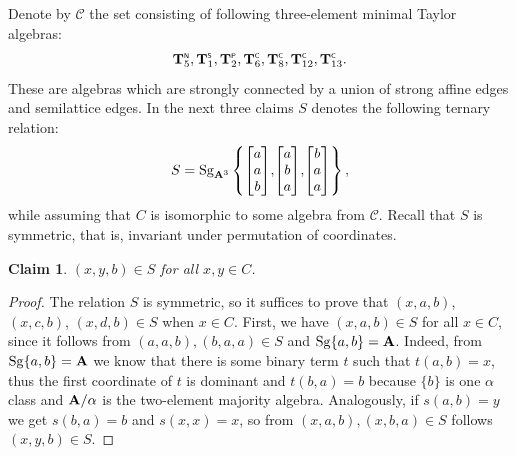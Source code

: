 \documentclass[11pt]{amsart}
\newcommand{\m}[1]{\mathbf{\uppercase{#1}}}
\newcommand{\n}{\scriptscriptstyle{\mathsf{N}}}
\newcommand{\co}{\scriptscriptstyle{\mathsf{C}}}
\theoremstyle{definition}
\theoremstyle{remark}
\theoremstyle{plain}
\newtheorem{claim}[thm]{Claim}
\begin{document}
Denote by $\mathcal{C}$ the set consisting of following three-element minimal Taylor algebras: $$\m t_5^{\n}, \m t_1^{\scriptscriptstyle{\mathsf{S}}}, \m t_2^{\scriptscriptstyle{\mathsf{P}}}, \m t_6^{\co}, \m t_8^{\co}, \m t_{12}^{\co}, \m t_{13}^{\co}.$$
These are algebras which are strongly connected by a union of strong affine edges and semilattice edges. In the next three claims $S$ denotes the following ternary relation:
\[
S=\mathrm{Sg}_{\m a^3}\left\{
\begin{bmatrix}
a \\
a \\
b
\end{bmatrix}\!,\!
\begin{bmatrix}
a \\
b \\
a
\end{bmatrix}\!,\!
\begin{bmatrix}
b \\
a \\
a
\end{bmatrix}
\right\},
\]
while assuming that $C$ is isomorphic to some algebra from $\mathcal{C}$. Recall that $S$ is symmetric, that is, invariant under permutation of coordinates.
\begin{claim}
 $(x,y,b)\in S$ for all $x,y\in  C$.
\end{claim}
\begin{proof}
The relation $S$ is symmetric, so it suffices to prove that $(x,a,b)$, $(x,c,b)$, $(x,d,b)\in S$ when $x\in C$. First, we have $(x,a,b)\in S$ for all $x\in C$, since it follows from $(a,a,b),(b,a,a)\in S$ and $\mathrm{Sg}\{a,b\}=\m a$. Indeed, from $\mathrm{Sg}\{a,b\}=\m a$ we know that there is some binary term $t$ such that $t(a,b)=x$, thus the first coordinate of $t$ is dominant and $t(b,a)=b$ because $\{b\}$ is one $\alpha$ class and $\m a/\alpha$ is the two-element majority algebra. Analogously, if $s(a,b)=y$ we get $s(b,a)=b$ and $s(x,x)=x$, so from $(x,a,b),(x,b,a)\in S$ follows $(x,y,b)\in S$.
\end{proof}
\end{document}
